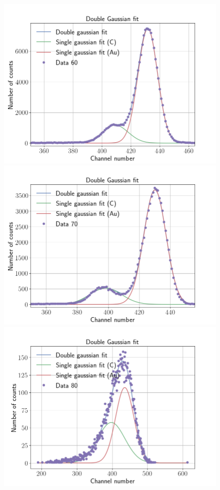 \begin{figure}
\includegraphics[width=0.99\columnwidth]{Data_60}
\includegraphics[width=0.99\columnwidth]{Data_70}
\includegraphics[width=0.99\columnwidth]{Data_80}

\end{figure}
